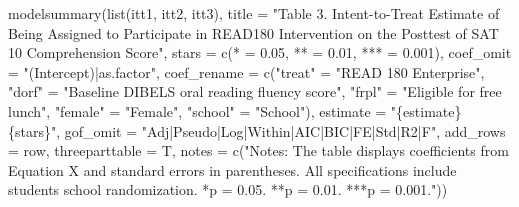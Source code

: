 \documentclass[
  letterpaper,
  DIV=11,
  numbers=noendperiod]{scrartcl}
\newenvironment{Shaded}{\begin{snugshade}}{\end{snugshade}}
\newcommand{\AttributeTok}[1]{\textcolor[rgb]{0.40,0.45,0.13}{#1}}
\newcommand{\FloatTok}[1]{\textcolor[rgb]{0.68,0.00,0.00}{#1}}
\newcommand{\FunctionTok}[1]{\textcolor[rgb]{0.28,0.35,0.67}{#1}}
\newcommand{\NormalTok}[1]{\textcolor[rgb]{0.00,0.23,0.31}{#1}}
\newcommand{\OtherTok}[1]{\textcolor[rgb]{0.00,0.23,0.31}{#1}}
\newcommand{\StringTok}[1]{\textcolor[rgb]{0.13,0.47,0.30}{#1}}
\begin{document}
\begin{Shaded}
\begin{Highlighting}[]
\FunctionTok{modelsummary}\NormalTok{(}\FunctionTok{list}\NormalTok{(itt1, itt2, itt3),}
             \AttributeTok{title =} \StringTok{"Table 3. Intent{-}to{-}Treat Estimate of Being Assigned to Participate in READ180 Intervention on the Posttest of SAT 10 Comprehension Score"}\NormalTok{,}
             \AttributeTok{stars =} \FunctionTok{c}\NormalTok{(}\StringTok{\textquotesingle{}*\textquotesingle{}} \OtherTok{=} \FloatTok{0.05}\NormalTok{, }\StringTok{\textquotesingle{}**\textquotesingle{}} \OtherTok{=} \FloatTok{0.01}\NormalTok{, }\StringTok{\textquotesingle{}***\textquotesingle{}} \OtherTok{=} \FloatTok{0.001}\NormalTok{),}
             \AttributeTok{coef\_omit =} \StringTok{"(Intercept)|as.factor"}\NormalTok{,}
             \AttributeTok{coef\_rename =} \FunctionTok{c}\NormalTok{(}\StringTok{"treat"} \OtherTok{=} \StringTok{"READ 180 Enterprise"}\NormalTok{, }
                             \StringTok{"dorf"} \OtherTok{=} \StringTok{"Baseline DIBELS oral reading fluency score"}\NormalTok{, }
                             \StringTok{"frpl"} \OtherTok{=} \StringTok{"Eligible for free lunch"}\NormalTok{, }
                             \StringTok{"female"} \OtherTok{=} \StringTok{"Female"}\NormalTok{, }\StringTok{"school"} \OtherTok{=} \StringTok{"School"}\NormalTok{),}
             \AttributeTok{estimate =} \StringTok{"\{estimate\}\{stars\}"}\NormalTok{,}
             \AttributeTok{gof\_omit =} \StringTok{"Adj|Pseudo|Log|Within|AIC|BIC|FE|Std|R2|F"}\NormalTok{,}
             \AttributeTok{add\_rows =}\NormalTok{ row,}
             \AttributeTok{threeparttable =}\NormalTok{ T,}
             \AttributeTok{notes =} \FunctionTok{c}\NormalTok{(}\StringTok{"Notes: The table displays coefficients from Equation X and standard errors in parentheses. All specifications include student\textquotesingle{}s school randomization. }
\StringTok{                       *p = 0.05. **p = 0.01. ***p = 0.001."}\NormalTok{))}
\end{Highlighting}
\end{Shaded}
\end{document}
